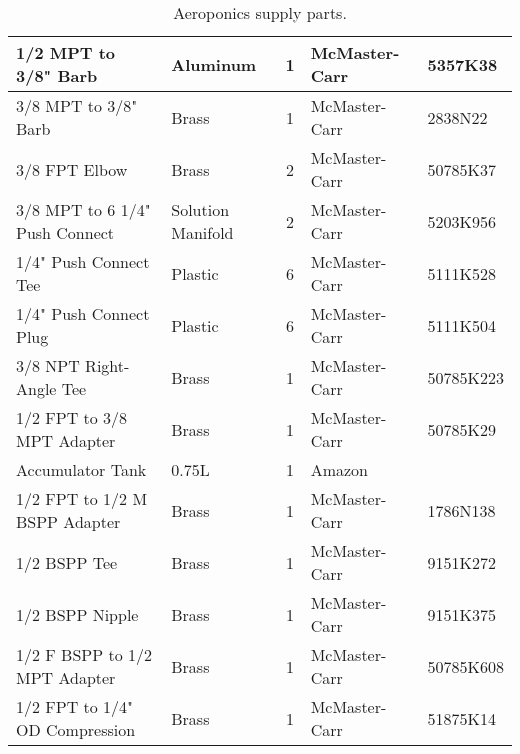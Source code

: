 \begin{table}[!ht]
\begin{tabular}{|l|l|c|l|l|}
        1/2 MPT to 3/8" Barb            & Aluminum                  & 1         & McMaster-Carr         & 5357K38       \\ \hline
        3/8 MPT to 3/8" Barb            & Brass                     & 1         & McMaster-Carr         & 2838N22       \\ \hline
        3/8 FPT Elbow                   & Brass                     & 2         & McMaster-Carr         & 50785K37      \\ \hline
        3/8 MPT to 6 1/4" Push Connect  & Solution Manifold         & 2         & McMaster-Carr         & 5203K956      \\ \hline
        1/4" Push Connect Tee           & Plastic                   & 6         & McMaster-Carr         & 5111K528      \\ \hline
        1/4" Push Connect Plug          & Plastic                   & 6         & McMaster-Carr         & 5111K504      \\ \hline
        3/8 NPT Right-Angle Tee         & Brass                     & 1         & McMaster-Carr         & 50785K223     \\ \hline
        1/2 FPT to 3/8 MPT Adapter      & Brass                     & 1         & McMaster-Carr         & 50785K29      \\ \hline
        Accumulator Tank                & 0.75L                     & 1         & Amazon                & ~             \\ \hline
        1/2 FPT to 1/2 M BSPP Adapter   & Brass                     & 1         & McMaster-Carr         & 1786N138      \\ \hline
        1/2 BSPP Tee                    & Brass                     & 1         & McMaster-Carr         & 9151K272      \\ \hline
        1/2 BSPP Nipple                 & Brass                     & 1         & McMaster-Carr         & 9151K375      \\ \hline
        1/2 F BSPP to 1/2 MPT Adapter   & Brass                     & 1         & McMaster-Carr         & 50785K608     \\ \hline
        1/2 FPT to 1/4" OD Compression  & Brass                     & 1         & McMaster-Carr         & 51875K14      \\ \hline
    \end{tabular}
    \caption{Aeroponics supply parts.}
    \label{tab:aeroponics_supply_parts}
\end{table}

